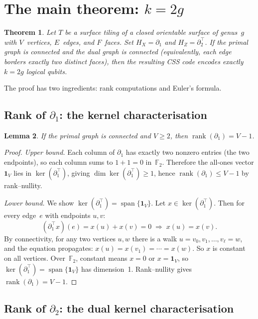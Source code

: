 \documentclass[11pt,a4paper]{article}
\newtheorem{theorem}{Theorem}
\newtheorem{lemma}[theorem]{Lemma}
\newcommand{\FF}{\mathbb{F}_2}
\begin{document}
\section{The main theorem: $k = 2g$}

\begin{theorem}\label{thm:main}
Let $T$ be a surface tiling of a closed orientable surface of genus~$g$
with $V$~vertices, $E$~edges, and $F$~faces. Set $H_X = \partial_1$ and
$H_Z = \partial_2^\top$. If the primal graph is connected and the dual
graph is connected (equivalently, each edge borders exactly two distinct
faces), then the resulting CSS code encodes exactly $k = 2g$ logical qubits.
\end{theorem}

The proof has two ingredients: rank computations and Euler's formula.

\subsection{Rank of $\partial_1$: the kernel characterisation}

\begin{lemma}\label{lem:rank_d1}
If the primal graph is connected and $V \geq 2$, then
$\operatorname{rank}(\partial_1) = V - 1$.
\end{lemma}

\begin{proof}
\emph{Upper bound.} Each column of $\partial_1$ has exactly two nonzero
entries (the two endpoints), so each column sums to $1 + 1 = 0$ in~$\FF$.
Therefore the all-ones vector $\mathbf{1}_V$ lies in
$\ker(\partial_1^\top)$, giving
$\dim \ker(\partial_1^\top) \geq 1$, hence
$\operatorname{rank}(\partial_1) \leq V - 1$ by rank--nullity.

\emph{Lower bound.} We show $\ker(\partial_1^\top) = \operatorname{span}\{\mathbf{1}_V\}$.
Let $x \in \ker(\partial_1^\top)$. Then for every edge~$e$ with endpoints
$u, v$:
\[
  (\partial_1^\top x)(e) = x(u) + x(v) = 0 \;\Longrightarrow\; x(u) = x(v).
\]
By connectivity, for any two vertices $u, w$ there is a walk $u = v_0,
v_1, \ldots, v_\ell = w$, and the equation propagates:
$x(u) = x(v_1) = \cdots = x(w)$. So $x$ is constant on all vertices.
Over~$\FF$, constant means $x = 0$ or $x = \mathbf{1}_V$, so
$\ker(\partial_1^\top) = \operatorname{span}\{\mathbf{1}_V\}$ has
dimension~1. Rank--nullity gives $\operatorname{rank}(\partial_1) = V - 1$.
\end{proof}

\subsection{Rank of $\partial_2$: the dual kernel characterisation}
\end{document}
